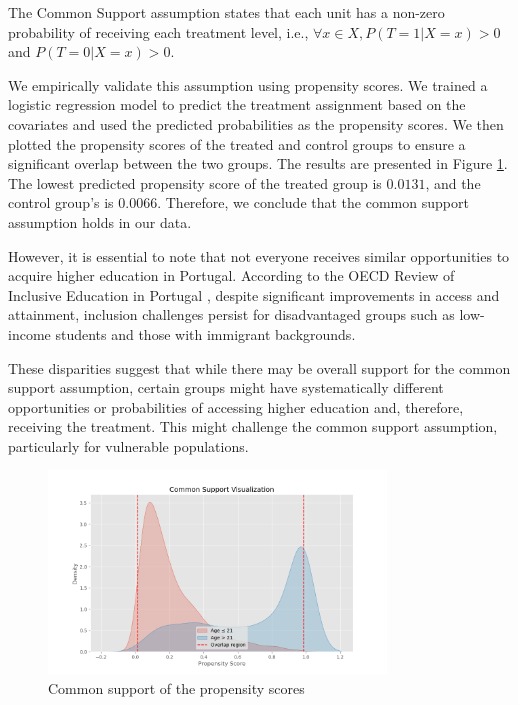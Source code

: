 \documentclass{article}
\begin{document}
The Common Support assumption states that each unit has a non-zero probability of receiving each treatment level, i.e., $\forall x \in X, P(T=1|X=x) > 0$ and $P(T=0|X=x) > 0$.

We empirically validate this assumption using propensity scores. We trained a logistic regression model to predict the treatment assignment based on the covariates and used the predicted probabilities as the propensity scores. We then plotted the propensity scores of the treated and control groups to ensure a significant overlap between the two groups. The results are presented in Figure \ref{fig:common_support}. The lowest predicted propensity score of the treated group is $0.0131$, and the control group's is $0.0066$. Therefore, we conclude that the common support assumption holds in our data.

However, it is essential to note that not everyone receives similar opportunities to acquire higher education in Portugal. According to the OECD Review of Inclusive Education in Portugal \citep{/content/publication/a9c95902-en}, despite significant improvements in access and attainment, inclusion challenges persist for disadvantaged groups such as low-income students and those with immigrant backgrounds. 

These disparities suggest that while there may be overall support for the common support assumption, certain groups might have systematically different opportunities or probabilities of accessing higher education and, therefore, receiving the treatment. This might challenge the common support assumption, particularly for vulnerable populations.


\begin{figure}
    \centering
    \caption{Common support of the propensity scores}
    \label{fig:common_support}
    \includegraphics[width = 0.8\textwidth]{plots/common_support.png}
\end{figure}
\end{document}
